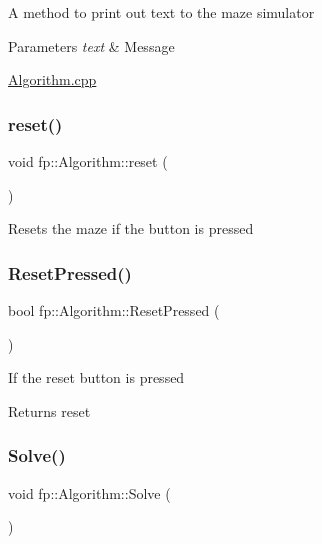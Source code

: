 A method to print out text to the maze simulator 
\begin{DoxyParams}{Parameters}
{\em text} & Message\\
\hline
\end{DoxyParams}
\hyperlink{_algorithm_8cpp}{Algorithm.\+cpp} \mbox{\label{classfp_1_1_algorithm_a182de09af3489ef37ea0fd4a4baeacbc}} 
\subsubsection{\texorpdfstring{reset()}{reset()}}
{\footnotesize\ttfamily void fp\+::\+Algorithm\+::reset (\begin{DoxyParamCaption}{ }\end{DoxyParamCaption})}

Resets the maze if the button is pressed \mbox{\label{classfp_1_1_algorithm_a169e9e4e400a85687aa6554a3cbd2e04}} 
\subsubsection{\texorpdfstring{Reset\+Pressed()}{ResetPressed()}}
{\footnotesize\ttfamily bool fp\+::\+Algorithm\+::\+Reset\+Pressed (\begin{DoxyParamCaption}{ }\end{DoxyParamCaption})}

If the reset button is pressed \begin{DoxyReturn}{Returns}
reset 
\end{DoxyReturn}
\mbox{\label{classfp_1_1_algorithm_ac6e4cae1f140d0155f2feaaaf1d287c1}} 
\subsubsection{\texorpdfstring{Solve()}{Solve()}}
{\footnotesize\ttfamily void fp\+::\+Algorithm\+::\+Solve (\begin{DoxyParamCaption}{ }\end{DoxyParamCaption})}

